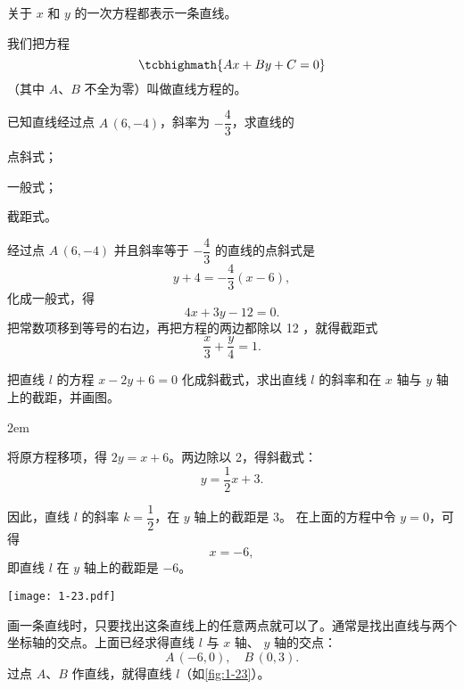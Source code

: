 关于 $x$ 和 $y$ 的一次方程都表示一条直线。

我们把方程
\begin{equation}
  \label{eq:linear_eqation_2}
  \tcbhighmath{Ax+By+C=0}
\end{equation}
（其中 $A$、$B$ 不全为零）叫做直线方程的。

\begin{example}
  已知直线经过点 $A\,(6,-4)$，斜率为 $-\dfrac{4}{3}$，求直线的
  \begin{enumerate*} 
    \item 点斜式；
    \item 一般式；
    \item 截距式。
  \end{enumerate*}
\end{example}
\begin{solution}
  经过点 $A\,(6,-4)$ 并且斜率等于 $-\dfrac{4}{3}$ 的直线的点斜式是
  \[y+4=-\frac{4}{3}(x-6),\]
  化成一般式，得
  \[ 4x+3y-12= 0.\]
  把常数项移到等号的右边，再把方程的两边都除以 12 ，就得截距式
  \[ \frac{x}{3}+\frac{y}{4}=1.\]
\end{solution}

\begin{example}
  把直线 $l$ 的方程 $x-2y+6=0$ 化成斜截式，求出直线 $l$ 的斜率和在 $x$ 轴与 $y$ 轴上的截距，并画图。
\end{example}
\noindent
\begin{minipage}{0.55\linewidth}\parindent2em
\begin{solution}
  将原方程移项，得 $2y=x+6$。两边除以 2，得斜截式：
  \[ y = \frac{1}{2}x + 3.\]

  因此，直线 $l$ 的斜率 $k=\dfrac{1}{2}$，在 $y$ 轴上的截距是 3。
  在上面的方程中令 $y=0$，可得
  \[x = - 6,\]
  即直线 $l$ 在 $y$ 轴上的截距是 $-6$。
\end{solution}
\end{minipage}\hfill
\begin{minipage}{0.4\linewidth}\centering
\begin{figurehere}
  \texttt{[image: 1-23.pdf]}
  \caption{}\label{fig:1-23}
\end{figurehere}
\end{minipage}

\medskip
画一条直线时，只要找出这条直线上的任意两点就可以了。通常是找出直线与两个坐标轴的交点。上面已经求得直线 \(l\) 与 \(x\) 轴、 \(y\) 轴的交点：
\[A\,(-6,0),\quad B\,(0,3).\]
过点 $A$、$B$ 作直线，就得直线 $l$（如\cref{fig:1-23}）。

